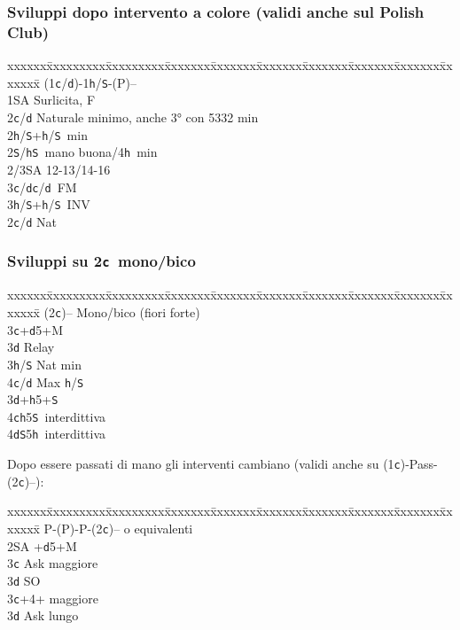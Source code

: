 \documentclass[a4paper,italian]{article}
\newcommand{\BS}{\small{\texttt{S}}}
\newcommand{\BC}{\small{\texttt{c}}}
\newcommand{\BD}{\small{\texttt{d}}}
\newcommand{\BH}{\small{\texttt{h}}}
\newcommand{\pdfc}{\texorpdfstring{\texttt{c}}{C}}
\newenvironment{bidtable}
{\begin{tabbing}

    xxxxxx\=xxxxxxxxx\=xxxxxxxxx\=xxxxxxx\=xxxxxxx\=xxxxxxx\=xxxxxxx\=xxxxxxx\=xxxxxxx\=xxxxxxx\=\kill}
{\end{tabbing} }%
\begin{document}
\begin{multicols}{2}
    \subsubsection{Sviluppi dopo intervento a colore (validi anche sul Polish Club)}

    \begin{bidtable}
        (1\BC/\BD)-1\BH/\BS-(P)--\+\\
        1\small{SA} \> Surlicita, F\+\\
        2\BC/\BD \> Naturale minimo, anche 3° con 5332 min\\
        2\BH/\BS {}+\BH/\BS\ min\\
        2\BS/\BH {}\BS\ mano buona/4\BH\ min\\
        2/3\small{SA}  12-13/14-16\\
        3\BC/\BD {}\BC/\BD\ FM\\
        3\BH/\BS {}+\BH/\BS\ INV\-\\
        2\BC/\BD \> Nat
    \end{bidtable}

    \subsubsection{Sviluppi su 2\pdfc\ mono/bico}

    \begin{bidtable}
        (2\BC)-- \> Mono/bico (fiori forte)\+\\
        3\BC {}+\BD 5+M\+\\
        3\BD \> Relay\+\\
        3\BH/\BS \> Nat min\\
        4\BC/\BD \> Max \BH /\BS \-\-\\
        3\BD {}+\BH 5+\BS \\
        4\BC {}\BH 5\BS\ interdittiva\\
        4\BD {}\BS 5\BH\ interdittiva
    \end{bidtable}
    Dopo essere passati di mano gli interventi cambiano (validi anche su (1\BC )-Pass-(2\BC )--):
    \begin{bidtable}
        P-(P)-P-(2\BC)-- o equivalenti\+\\
        2\small{SA} +\BD 5+M\+\\
        3\BC \> Ask maggiore\\
        3\BD \> SO\-\\
        3\BC {}+4+ maggiore\+\\
        3\BD \> Ask lungo
    \end{bidtable}


\end{multicols}
\end{document}

